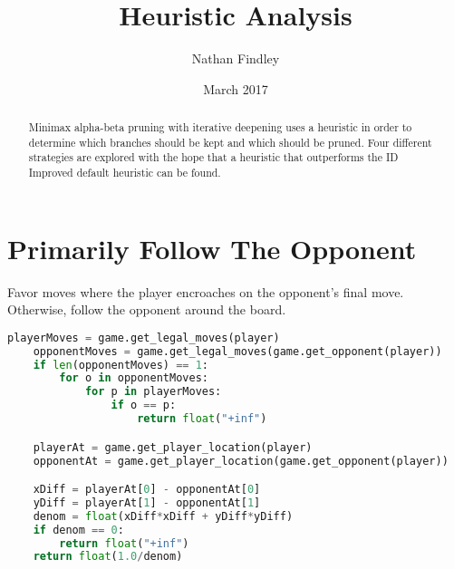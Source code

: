 \documentclass[10pt, a4paper]{article}
\title{Heuristic Analysis}
\author{Nathan Findley}
\date{March 2017}
\begin{document}
\maketitle
\tableofcontents

\begin{abstract}

Minimax alpha-beta pruning with iterative deepening uses a heuristic in
order to determine which branches should be kept and which should be pruned.
Four different strategies are explored with the hope that a heuristic that outperforms
the ID Improved default heuristic can be found.

\end{abstract}

\section{Primarily Follow The Opponent}

Favor moves where the player encroaches on the opponent's final move. Otherwise,
follow the opponent around the board.

\begin{lstlisting}[language=Python]
    playerMoves = game.get_legal_moves(player)
    opponentMoves = game.get_legal_moves(game.get_opponent(player))
    if len(opponentMoves) == 1:
        for o in opponentMoves:
            for p in playerMoves:
                if o == p:
                    return float("+inf")

    playerAt = game.get_player_location(player)
    opponentAt = game.get_player_location(game.get_opponent(player))

    xDiff = playerAt[0] - opponentAt[0]
    yDiff = playerAt[1] - opponentAt[1]
    denom = float(xDiff*xDiff + yDiff*yDiff)
    if denom == 0:
        return float("+inf")
    return float(1.0/denom)
\end{lstlisting}
\end{document}
